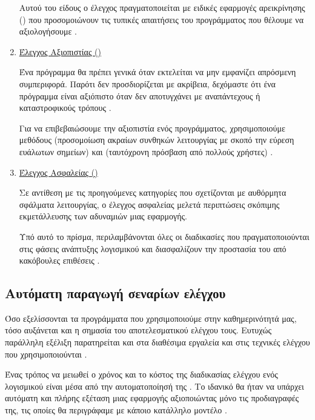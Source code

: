 \begin{enumerate}
    Αυτού του είδους ο έλεγχος πραγματοποιείται με ειδικές εφαρμογές αρεικρίνησης () 
    που προσομοιώνουν τις τυπικές απαιτήσεις του προγράμματος που θέλουμε να αξιολογήσουμε \cite{vokolos1998performance}.

    \item \underline{Έλεγχος Αξιοπιστίας ()}
    
    Ένα πρόγραμμα θα πρέπει γενικά όταν εκτελείται να μην εμφανίζει απρόσμενη συμπεριφορά.
    Παρότι δεν προσδιορίζεται με ακρίβεια, 
    δεχόμαστε ότι ένα πρόγραμμα είναι αξιόπιστο όταν δεν αποτυγχάνει με αναπάντεχους ή καταστροφικούς τρόπους \cite{hamlet1994foundations}.

    Για να επιβεβαιώσουμε την αξιοπιστία ενός προγράμματος,
    χρησιμοποιούμε μεθόδους  (προσομοίωση ακραίων συνθηκών λειτουργίας με σκοπό την εύρεση ευάλωτων σημείων) \cite{pradeep2019pragmatic}
    και  (ταυτόχρονη πρόσβαση από πολλούς χρήστες) \cite{pan1999software}.

    \item \underline{Έλεγχος Ασφαλείας ()}
    
    Σε αντίθεση με τις προηγούμενες κατηγορίες που σχετίζονται με αυθόρμητα σφάλματα λειτουργίας,
    ο έλεγχος ασφαλείας μελετά περιπτώσεις σκόπιμης εκμετάλλευσης των αδυναμιών μιας εφαρμογής.

    Υπό αυτό το πρίσμα, περιλαμβάνονται όλες οι διαδικασίες που πραγματοποιούνται στις φάσεις ανάπτυξης λογισμικού
    και διασφαλίζουν την προστασία του από κακόβουλες επιθέσεις \cite{potter2004software}.

\end{enumerate}

\subsection{Αυτόματη παραγωγή σεναρίων ελέγχου}

Όσο εξελίσσονται τα προγράμματα που χρησιμοποιούμε στην καθημερινότητά μας, 
τόσο αυξάνεται και η σημασία του αποτελεσματικού ελέγχου τους.
Ευτυχώς παράλληλη εξέλιξη παρατηρείται και στα διαθέσιμα εργαλεία και στις τεχνικές ελέγχου που χρησιμοποιούνται \cite{chauhan2014latest}.

Ένας τρόπος να μειωθεί ο χρόνος και το κόστος της διαδικασίας ελέγχου ενός λογισμικού είναι μέσα από την αυτοματοποίησή της \cite{dustin1999automated}.
Το ιδανικό θα ήταν να υπάρχει αυτόματη και πλήρης εξέταση μιας εφαρμογής αξιοποιώντας μόνο τις προδιαγραφές της,
τις οποίες θα περιγράφαμε με κάποιο κατάλληλο μοντέλο \cite{bertolino2007software}.

